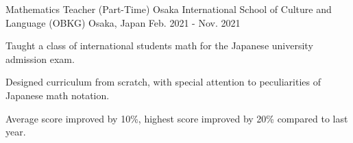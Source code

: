 \begin{cventries}

  \cventry
    {Mathematics Teacher (Part-Time)} %
    {Osaka International School of Culture and Language (OBKG)} %
    {Osaka, Japan} %
    {Feb. 2021 - Nov. 2021} %
    {
      \begin{cvitems} %
        \item {Taught a class of international students math for the Japanese university admission exam.}
        \item {Designed curriculum from scratch, with special attention to peculiarities of Japanese math notation.}
        \item {Average score improved by 10\%, highest score improved by 20\% compared to last year.}
      \end{cvitems}
    }

\end{cventries}
